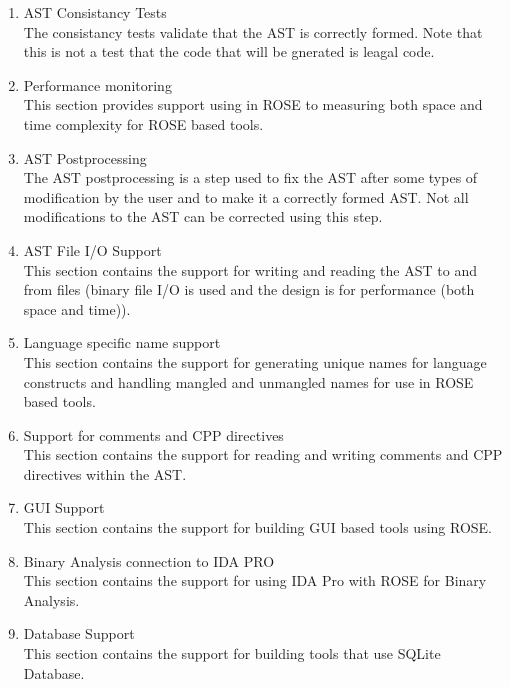 \begin{enumerate}
\begin{enumerate}
      \item AST Consistancy Tests \\
         The consistancy tests validate that the AST is correctly formed. Note that this
         is not a test that the code that will be gnerated is leagal code.

      \item Performance monitoring \\
         This section provides support using in ROSE to measuring both space and 
         time complexity for ROSE based tools.

      \item AST Postprocessing \\
         The AST postprocessing is a step used to fix the AST after some types of 
         modification by the user and to make it a correctly formed AST. Not all
         modifications to the AST can be corrected using this step.

      \item AST File I/O Support \\
         This section contains the support for writing and reading the AST to and from
         files (binary file I/O is used and the design is for performance (both space and
         time)).

      \item Language specific name support \\
         This section contains the support for generating unique names for language
         constructs and handling mangled and unmangled names for use in ROSE based tools.

      \item Support for comments and CPP directives \\
         This section contains the support for reading and writing comments and CPP
         directives within the AST.

      \item GUI Support \\
         This section contains the support for building GUI based tools using ROSE.

      \item Binary Analysis connection to IDA PRO \\
         This section contains the support for using IDA Pro with ROSE for Binary Analysis.

      \item Database Support \\
         This section contains the support for building tools that use SQLite Database.


\end{enumerate}
\end{enumerate}
